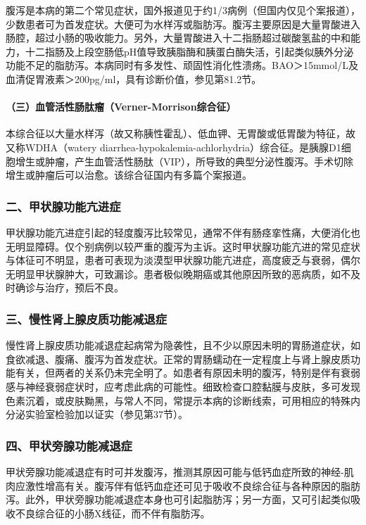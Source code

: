 腹泻是本病的第二个常见症状，国外报道见于约1/3病例（但国内仅见个案报道），少数患者可为首发症状。大便可为水样泻或脂肪泻。腹泻主要原因是大量胃酸进入肠腔，超过小肠的吸收能力。另外，大量胃酸进入十二指肠超过碳酸氢盐的中和能力，十二指肠及上段空肠低pH值导致胰脂酶和胰蛋白酶失活，引起类似胰外分泌功能不足的脂肪泻。本病同时有多发性、顽固性消化性溃疡。BAO＞15mmol/L及血清促胃液素＞200pg/ml，具有诊断价值，参见第81.2节。

\paragraph{（三）血管活性肠肽瘤（Verner-Morrison综合征）}

本综合征以大量水样泻（故又称胰性霍乱）、低血钾、无胃酸或低胃酸为特征，故又称WDHA（watery
diarrhea-hypokalemia-achlorhydria）综合征。是胰腺D1细胞增生或肿瘤，产生血管活性肠肽（VIP），所导致的典型分泌性腹泻。手术切除增生或肿瘤后可以治愈。该综合征国内有多篇个案报道。

\subsubsection{二、甲状腺功能亢进症}

甲状腺功能亢进症引起的轻度腹泻比较常见，通常不伴有肠痉挛性痛，大便消化也无明显障碍。仅个别病例以较严重的腹泻为主诉。这时甲状腺功能亢进的常见症状与体征可不明显，患者可表现为淡漠型甲状腺功能亢进症，高度疲乏与衰弱，偶尔无明显甲状腺肿大，可致漏诊。患者极似晚期癌或其他原因所致的恶病质，如不及时确诊与治疗，预后不良。

\subsubsection{三、慢性肾上腺皮质功能减退症}

慢性肾上腺皮质功能减退症起病常为隐袭性，且不少以原因未明的胃肠道症状，如食欲减退、腹痛、腹泻为首发症状。正常的胃肠蠕动在一定程度上与肾上腺皮质功能有关，但两者的关系仍未完全明了。如患者有原因未明的腹泻，特别是伴有衰弱感与神经衰弱症状时，应考虑此病的可能性。细致检查口腔黏膜与皮肤，多可发现色素沉着，或皮肤黝黑，与常人不同，常提示本病的诊断线索，可用相应的特殊内分泌实验室检验加以证实（参见第37节）。

\subsubsection{四、甲状旁腺功能减退症}

甲状旁腺功能减退症有时可并发腹泻，推测其原因可能与低钙血症所致的神经-肌肉应激性增高有关。腹泻伴有低钙血症还可见于吸收不良综合征与各种原因的脂肪泻。此外，甲状旁腺功能减退症本身也可引起脂肪泻；另一方面，又可引起类似吸收不良综合征的小肠X线征，而不伴有脂肪泻。

